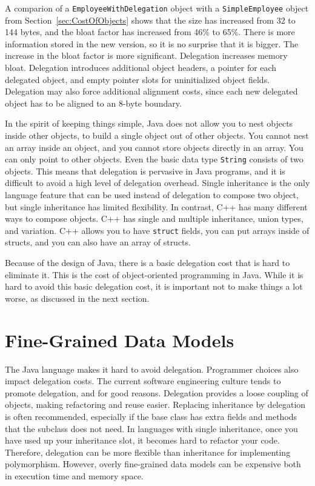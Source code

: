 A comparion of a \texttt{EmployeeWithDelegation} object with a \texttt{SimpleEmployee} object from Section~\ref{sec:CostOfObjects} shows that the size has increased from 32 to 144 bytes, and the bloat factor has increased from 46\% to 65\%. There is more information stored in the new version, so it is no surprise that it is bigger. The increase in the bloat factor is more significant. Delegation increases memory bloat. Delegation introduces additional object headers, a pointer for each delegated object, and empty pointer slots for uninitialized object fields. Delegation may also force additional alignment costs, since each new delegated object has to be aligned to an 8-byte boundary. 

In the spirit of keeping things simple, Java does not allow you to nest objects inside other objects, to build a single object out of other objects. You cannot nest an array inside an object, and you cannot store objects directly in an array.  You can only point to other objects. Even the basic data type \texttt{String} consists of two objects. This means that delegation is pervasive in Java programs, and it is difficult to avoid a high level of delegation overhead. Single inheritance is the only language feature that can be used instead of delegation to compose two object, but single inheritance has limited flexibility.  In contrast, C++ has many different ways to compose objects. C++ has single and multiple inheritance, union types, and variation. C++ allows you to have \texttt{struct} fields, you can put arrays inside of structs, and you can also have an array of structs.  

Because of the design of Java, there is a basic delegation cost that is hard to eliminate it. This is the cost of object-oriented programming in Java. While it is hard to avoid this basic delegation cost, it is important not to make things a lot worse, as discussed in the next section. 

\section{Fine-Grained Data Models}
\label{fine-grained-data-models}

The Java language makes it hard to avoid delegation. Programmer choices also impact delegation costs.  The current software engineering culture tends to promote delegation, and for good reasons. Delegation provides a loose coupling of objects, making refactoring and reuse easier. Replacing inheritance by delegation is often recommended, especially if the base class has extra fields and methods that the subclass does not need. In languages with single inheritance, once you have used up your inheritance slot, it becomes hard to refactor your code. Therefore, delegation can be more flexible than inheritance for implementing polymorphism. However, overly fine-grained data models can be expensive both in execution time and memory space. 

